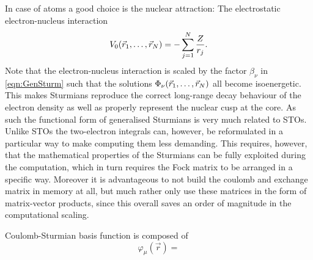 In case of atoms a good choice is the nuclear attraction:
The electrostatic electron-nucleus interaction
\[
	V_0(\vec{r}_1, \ldots, \vec{r}_N) = - \sum_{j=1}^N \frac{Z}{r_j}.
\]
Note that the electron-nucleus interaction is scaled by the factor $\beta_\nu$ in \eqref{eqn:GenSturm}
such that the solutions $\Phi_\nu(\vec{r}_1, \ldots, \vec{r}_N)$ all become isoenergetic.
This makes Sturmians reproduce the correct long-range decay behaviour of the electron density
as well as properly represent the nuclear cusp at the core.
As such the functional form of generalised Sturmians is very much related to STOs.
Unlike STOs the two-electron integrals can, however, be reformulated in a particular way
to make computing them less demanding.
This requires, however, that the mathematical properties of the Sturmians
can be fully exploited during the computation,
which in turn requires the Fock matrix to be arranged in a specific way.
Moreover it is advantageous to not build the coulomb and exchange matrix in memory at all,
but much rather only use these matrices in the form of matrix-vector products,
since this overall saves an order of magnitude in the computational scaling.


Coulomb-Sturmian basis function is composed of
\[ \varphi_\mu(\vec{r}) = \]



